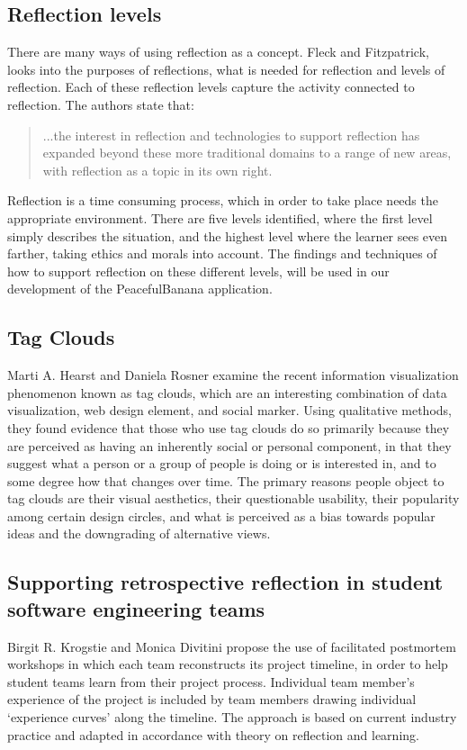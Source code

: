 \subsection*{Reflection levels}
There are many ways of using reflection as a concept. Fleck and Fitzpatrick\citep{Fleck2010}, looks into the purposes of reflections, what is needed for reflection and levels of reflection. Each of these reflection levels capture the activity connected to reflection. The authors state that: 
\begin{quotation}
...the interest in reflection and technologies to support reflection has expanded beyond these more traditional domains to a range of new areas, with reflection as a topic in its own right. 
\end{quotation}
Reflection is a time consuming process, which in order to take place needs the appropriate environment. There are five levels identified, where the first level simply describes the situation, and the highest level where the learner sees even farther, taking ethics and morals into account. The findings and techniques of how to support reflection on these different levels\citep{Fleck2010}, will be used in our development of the PeacefulBanana application. 

\subsection{Tag Clouds}
Marti A. Hearst and Daniela Rosner\citep{Hearst2008} examine the recent information visualization phenomenon known as tag clouds, which are an interesting combination of data visualization, web design element, and social marker. Using qualitative methods, they found evidence that those who use tag clouds do so primarily because they are perceived as having an inherently social or personal component, in that they suggest what a person or a group of people is doing or is interested in, and to some degree how that changes over time. The primary reasons people object to tag clouds are their visual aesthetics, their questionable usability, their popularity among certain design circles, and what is perceived as a bias towards popular ideas and the downgrading of alternative views.

\subsection{Supporting retrospective reflection in student software engineering teams}
Birgit R. Krogstie and Monica Divitini\citep{Krogstie2009} propose the use of facilitated postmortem workshops in which each team reconstructs its project timeline, in order to help student teams learn from their project process. Individual team member's experience of the project is included by team members drawing individual ‘experience curves’ along the timeline. The approach is based on current industry practice and adapted in accordance with theory on reflection and learning.

